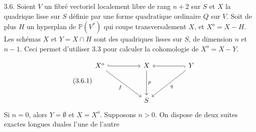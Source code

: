 3.6. Soient $V$ un fibré vectoriel localement libre de rang $n + 2$ sur $S$ et $X$ la quadrique lisse sur $S$ définie par une forme quadratique ordinaire $Q$ sur $V$. Soit de plus $H$ un hyperplan de $\mathbb{P}(V^{*})$ qui coupe transversalement $X$, et $X^{o} = X - H$. Les schémas $X$ et $Y = X \cap H$ sont des quadriques lisses sur $S$, de dimension $n$ et $n - 1$. Ceci permet d'utiliser 3.3 pour calculer la cohomologie de $X^{o} = X - Y$.



\begin{equation}\tag{3.6.1}
\begin{tikzcd}[column sep=huge, row sep=huge]
X^{o} \arrow[r, hook] \arrow[rd, "f"'] & X \arrow[d, "p"] & Y \arrow[l, hook] \arrow[ld, "q"] \\
 & S &
\end{tikzcd}
\end{equation}
Si $n = 0$, alors $Y = \emptyset$ et $X = X^{o}$. Supposons $n > 0$. On dispose de deux suites exactes longues duales l'une de l'autre

